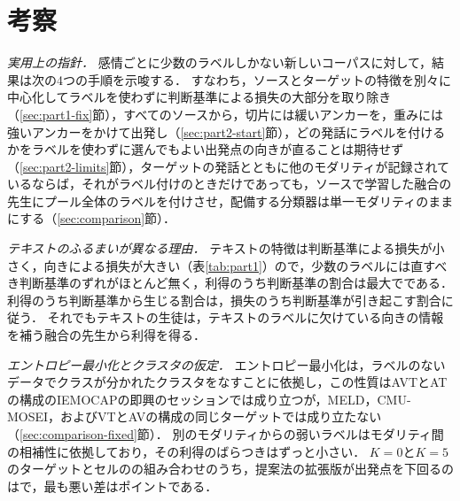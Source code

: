 \section{考察}
\label{sec:discussion}

\emph{実用上の指針．}
感情ごとに少数のラベルしかない新しいコーパスに対して，結果は次の4つの手順を示唆する．
すなわち，ソースとターゲットの特徴を別々に中心化してラベルを使わずに判断基準による損失の大部分を取り除き（\ref{sec:part1-fix}節），すべてのソースから，切片には緩いアンカーを，重みには強いアンカーをかけて出発し（\ref{sec:part2-start}節），どの発話にラベルを付けるかをラベルを使わずに選んでもよい出発点の向きが直ることは期待せず（\ref{sec:part2-limits}節），ターゲットの発話とともに他のモダリティが記録されているならば，それがラベル付けのときだけであっても，ソースで学習した融合の先生にプール全体のラベルを付けさせ，配備する分類器は単一モダリティのままにする（\ref{sec:comparison}節）．

\emph{テキストのふるまいが異なる理由．}
テキストの特徴は判断基準による損失が小さく，向きによる損失が大きい（表\ref{tab:part1}）ので，少数のラベルには直すべき判断基準のずれがほとんど無く，利得のうち判断基準の割合は最大でである．
利得のうち判断基準から生じる割合は，損失のうち判断基準が引き起こす割合に従う．
それでもテキストの生徒は，テキストのラベルに欠けている向きの情報を補う融合の先生から利得を得る．

\emph{エントロピー最小化とクラスタの仮定．}
エントロピー最小化は，ラベルのないデータでクラスが分かれたクラスタをなすことに依拠し，この性質はAVTとATの構成のIEMOCAPの即興のセッションでは成り立つが，MELD，CMU-MOSEI，およびVTとAVの構成の同じターゲットでは成り立たない（\ref{sec:comparison-fixed}節）．
別のモダリティからの弱いラベルはモダリティ間の相補性に依拠しており，その利得のばらつきはずっと小さい．
$K=0$と$K=5$のターゲットとセルのの組み合わせのうち，提案法の拡張版が出発点を下回るのはで，最も悪い差はポイントである．
